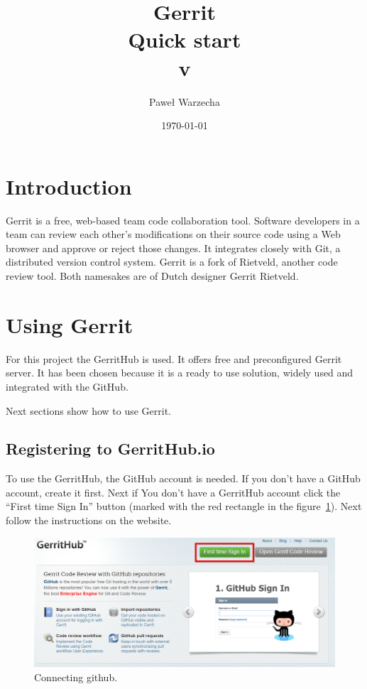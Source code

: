 \documentclass{article}
\title{Gerrit \\ Quick start \\ \small{v\version}}
\author{Paweł Warzecha}
\date{\today}
\begin{document}
\maketitle
\newpage

\tableofcontents
\newpage

\section{Introduction}

Gerrit is a free, web-based team code collaboration tool. Software developers in a team can review each other's modifications on their source code using a Web browser and approve or reject those changes. It integrates closely with Git, a distributed version control system. Gerrit is a fork of Rietveld, another code review tool. Both namesakes are of Dutch designer Gerrit Rietveld.\cite{Gerrit}

\section{Using Gerrit}

For this project the GerritHub\cite{GerritHub} is used. It offers free and preconfigured Gerrit server. It has been chosen because it is a ready to use solution, widely used and integrated with the GitHub. 

Next sections show how to use Gerrit.

\subsection{Registering to GerritHub.io}

To use the GerritHub, the GitHub account is needed. If you don't have a GitHub account, create it first. Next if You don't have a GerritHub account click the ``First time Sign In'' button (marked with the red rectangle in the figure~\ref{fig:Register}). Next follow the instructions on the website.

\begin{figure}[!ht]
  \centering
  \includegraphics[width=.75\textwidth]{img/RegisterToGerritHub}
  \caption{Connecting github.}
  \label{fig:Register}
\end{figure}
\end{document}
